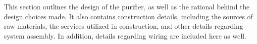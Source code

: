 %
%


\label{chap: construction}

This section outlines the design of the purifier, as well as the rational behind
the design choices made. It also contains construction details, including
the sources of raw materials, the services utilized in construction, and
other details regarding system assembly. In addition, details regarding wiring
are included here as well. \par
